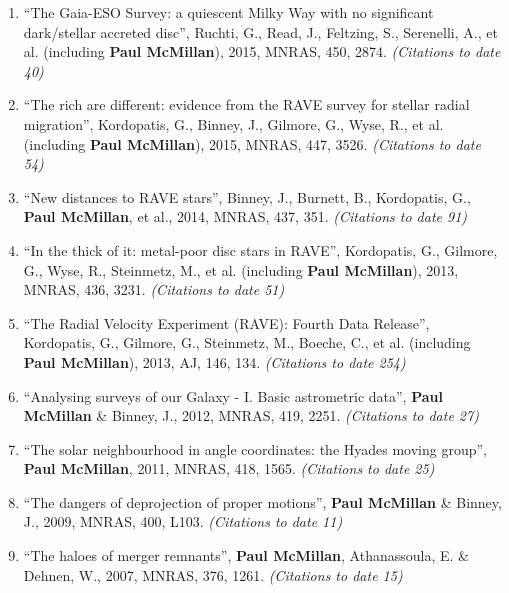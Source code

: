 \documentclass{resume}
\begin{document}
\begin{enumerate}
\item ``The Gaia-ESO Survey: a quiescent Milky Way with no significant dark/stellar accreted disc'', Ruchti, G., Read, J., Feltzing, S., Serenelli, A., et al. (including \textbf{Paul McMillan}), 2015, MNRAS, 450, 2874. \textit{(Citations to date 40)}

\item ``The rich are different: evidence from the RAVE survey for stellar radial migration'', Kordopatis, G., Binney, J., Gilmore, G., Wyse, R., et al. (including \textbf{Paul McMillan}), 2015, MNRAS, 447, 3526. \textit{(Citations to date 54)}

\item ``New distances to RAVE stars'', Binney, J., Burnett, B., Kordopatis, G., \textbf{Paul McMillan}, et al., 2014, MNRAS, 437, 351. \textit{(Citations to date 91)}

\item ``In the thick of it: metal-poor disc stars in RAVE'', Kordopatis, G., Gilmore, G., Wyse, R., Steinmetz, M., et al. (including \textbf{Paul McMillan}), 2013, MNRAS, 436, 3231. \textit{(Citations to date 51)}

\item ``The Radial Velocity Experiment (RAVE): Fourth Data Release'', Kordopatis, G., Gilmore, G., Steinmetz, M., Boeche, C., et al. (including \textbf{Paul McMillan}), 2013, AJ, 146, 134. \textit{(Citations to date 254)}

\item ``Analysing surveys of our Galaxy - I. Basic astrometric data'', \textbf{Paul McMillan} \& Binney, J., 2012, MNRAS, 419, 2251. \textit{(Citations to date 27)}

\item ``The solar neighbourhood in angle coordinates: the Hyades moving group'', \textbf{Paul McMillan}, 2011, MNRAS, 418, 1565. \textit{(Citations to date 25)}

\item ``The dangers of deprojection of proper motions'', \textbf{Paul McMillan} \& Binney, J., 2009, MNRAS, 400, L103. \textit{(Citations to date 11)}

\item ``The haloes of merger remnants'', \textbf{Paul McMillan}, Athanassoula, E. \& Dehnen, W., 2007, MNRAS, 376, 1261. \textit{(Citations to date 15)}

\end{enumerate}
\end{document}
